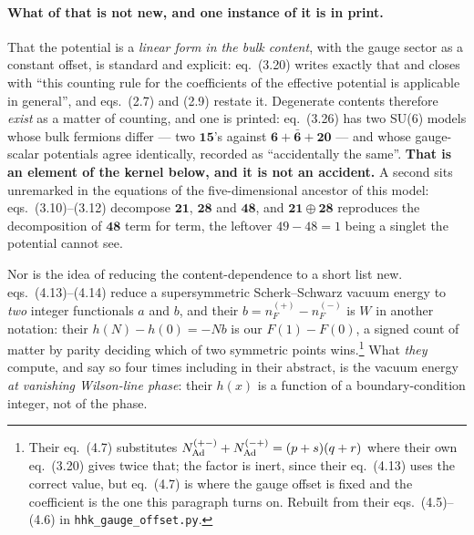\documentclass[11pt,a4paper]{article}
\newcommand{\rep}[1]{\mathbf{#1}}
\begin{document}
\paragraph{What of that is not new, and one instance of it is in print.} That the potential is a
\emph{linear form in the bulk content}, with the gauge sector as a constant offset, is standard and
explicit: \cite{HY04} eq.~(3.20) writes exactly that and closes with ``this counting rule for the
coefficients of the effective potential is applicable in general'', and \cite{CCD24} eqs.~(2.7) and
(2.9) restate it. Degenerate contents therefore \emph{exist} as a matter of counting, and one is
printed: \cite{CCD24} eq.~(3.26) has two SU(6) models whose bulk fermions differ --- two
$\rep{15}$'s against $\rep6+\rep{\bar6}+\rep{20}$ --- and whose gauge-scalar potentials agree
identically, recorded as ``accidentally the same''. \textbf{That is an element of the kernel below,
and it is not an accident.} A second sits unremarked in the equations of the five-dimensional
ancestor of this model: \cite{KTY17} eqs.~(3.10)--(3.12) decompose $\rep{21}$, $\rep{28}$ and
$\rep{48}$, and $\rep{21}\oplus\rep{28}$ reproduces the decomposition of $\rep{48}$ term for term,
the leftover $49-48=1$ being a singlet the potential cannot see.

\noindent Nor is the idea of reducing the content-dependence to a short list new. \cite{HHK03}
eqs.~(4.13)--(4.14) reduce a supersymmetric Scherk--Schwarz vacuum energy to \emph{two} integer
functionals $a$ and $b$, and their $b=n_F^{(+)}-n_F^{(-)}$ is $W$ in another notation: their
$h(N)-h(0)=-Nb$ is our $F(1)-F(0)$, a signed count of matter by parity deciding which of two
symmetric points wins.\footnote{Their eq.~(4.7) substitutes
$N_{\rm Ad}^{(+-)}+N_{\rm Ad}^{(-+)}=(p+s)(q+r)$ where their own eq.~(3.20) gives twice that; the
factor is inert, since their eq.~(4.13) uses the correct value, but eq.~(4.7) is where the gauge
offset is fixed and the coefficient is the one this paragraph turns on. Rebuilt from their
eqs.~(4.5)--(4.6) in \texttt{hhk\_\allowbreak gauge\_\allowbreak offset.py}.} What \emph{they}
compute, and say so four times including in their abstract, is the vacuum energy \emph{at vanishing
Wilson-line phase}: their $h(x)$ is a function of a boundary-condition integer, not of the phase.
\end{document}
